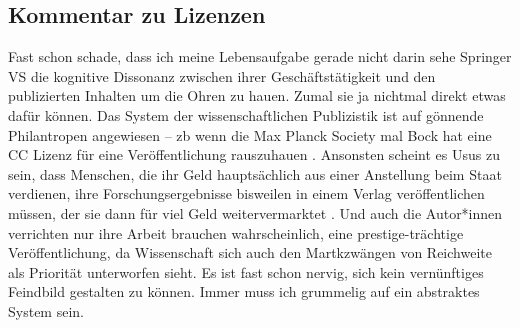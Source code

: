 \subsection{Kommentar zu Lizenzen}
Fast schon schade, dass ich meine Lebensaufgabe gerade nicht darin sehe Springer VS die kognitive Dissonanz zwischen ihrer Geschäftstätigkeit und den publizierten Inhalten um die Ohren zu hauen. Zumal sie ja nichtmal direkt etwas dafür können. Das System der wissenschaftlichen Publizistik ist auf gönnende Philantropen angewiesen -- \Gls{zb} wenn die Max Planck Society mal Bock hat eine CC Lizenz für eine Veröffentlichung rauszuhauen \autocite[Beispiel von hier:][178, übrigens ohne SA, damit auch die kommerzielle Publizistik Spaß damit haben kann]{Elsasser.2017}. Ansonsten scheint es Usus zu sein, dass Menschen, die ihr Geld hauptsächlich aus einer Anstellung beim Staat verdienen, ihre Forschungsergebnisse bisweilen in einem Verlag veröffentlichen müssen, der sie dann für viel Geld weitervermarktet \autocite[schade, dass sich das wahrscheinlich einige nicht anschauen werden, siw nicht über den akademischen Bereich \gls{oä} Zugang haben. Ist spannend, aber Paywall ftw (e-book {66,99€} am 12.06.2025)]{Schroder.2020}. Und auch die Autor*innen verrichten nur ihre Arbeit brauchen wahrscheinlich, eine prestige-trächtige Veröffentlichung, da Wissenschaft sich auch den Martkzwängen von Reichweite als Priorität unterworfen sieht. Es ist fast schon nervig, sich kein vernünftiges Feindbild gestalten zu können. %
Immer muss ich grummelig auf ein abstraktes System sein. 

